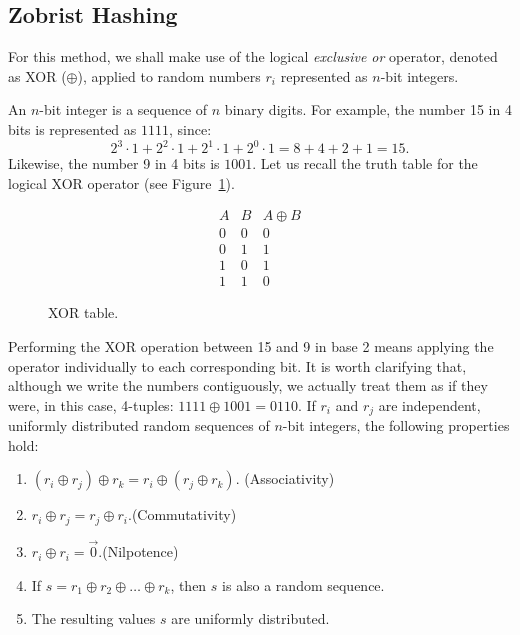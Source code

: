 \subsection{Zobrist Hashing}\label{ZobristHash}

For this method, we shall make use of the logical \textit{exclusive or} operator, denoted as XOR ($\oplus$), applied to random numbers $r_i$ represented as $n$-bit integers.

An $n$-bit integer is a sequence of $n$ binary digits. For example, the number 15 in 4 bits is represented as $1111$, since:
\[ 2^3 \cdot 1 + 2^2 \cdot 1 + 2^1 \cdot 1 + 2^0 \cdot 1 = 8 + 4 + 2 + 1 = 15. \]
Likewise, the number 9 in 4 bits is $1001$. Let us recall the truth table for the logical XOR operator (see Figure~\ref{TablaXOR}).
\vspace{10pt}

\begin{figure}
	\vspace{-30pt}
	\centering
	\[
	\begin{array}{c|c|c}
		A & B & A \oplus B \\
		\hline
		0 & 0 & 0 \\
		0 & 1 & 1 \\
		1 & 0 & 1 \\
		1 & 1 & 0
	\end{array}
	\]
	\caption{XOR table.}
	\label{TablaXOR}
\end{figure}\noindent Performing the XOR operation between 15 and 9 in base 2 means applying the operator individually to each corresponding bit. It is worth clarifying that, although we write the numbers contiguously, we actually treat them as if they were, in this case, 4-tuples: $1111 \oplus 1001 = 0110$. If $r_i$ and $r_j$ are independent, uniformly distributed random sequences of $n$-bit integers, the following properties hold:\hfill\break

\begin{enumerate}
	\item[P1)] $( r_i \oplus r_j ) \oplus r_k = r_i \oplus ( r_j \oplus r_k )$. \hfill(Associativity)
	\item[P2)] $r_i \oplus r_j = r_j \oplus r_i$.\hfill (Commutativity)
	\item[P3)] $r_i \oplus r_i = \vec{0}$.\hfill (Nilpotence)
	\item[P4)] If $s = r_1 \oplus r_2 \oplus \dots \oplus r_k$, then $s$ is also a random sequence.
	\item[P5)] The resulting values $s$ are uniformly distributed.
\end{enumerate}

